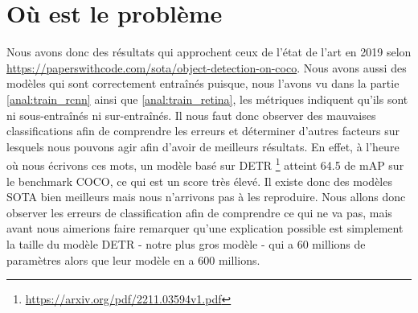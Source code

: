 \section{Où est le problème}\label{ch:eval:sex:problem}

Nous avons donc des résultats qui approchent ceux de l'état de l'art en 2019 selon \url{https://paperswithcode.com/sota/object-detection-on-coco}. Nous avons aussi des modèles qui sont correctement entraînés puisque, nous l'avons vu dans la partie \ref{anal:train_rcnn} ainsi que \ref{anal:train_retina}, les métriques indiquent qu'ils sont ni sous-entraînés ni sur-entraînés. Il nous faut donc observer des mauvaises classifications afin de comprendre les erreurs et déterminer d'autres facteurs sur lesquels nous pouvons agir afin d'avoir de meilleurs résultats. En effet, à l'heure où nous écrivons ces mots, un modèle basé sur DETR \footnote[1]{\url{https://arxiv.org/pdf/2211.03594v1.pdf}} atteint 64.5 de mAP sur le benchmark COCO, ce qui est un score très élevé. Il existe donc des modèles SOTA bien meilleurs mais nous n'arrivons pas à les reproduire. Nous allons donc observer les erreurs de classification afin de comprendre ce qui ne va pas, mais avant nous aimerions faire remarquer qu'une explication possible est simplement la taille du modèle DETR - notre plus gros modèle - qui a 60 millions de paramètres alors que leur modèle en a 600 millions.
